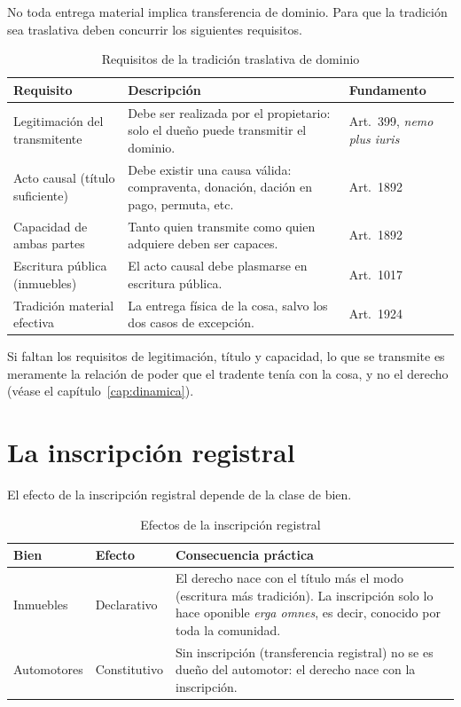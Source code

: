 \documentclass[12pt,oneside]{book}
\begin{document}
No toda entrega material implica transferencia de dominio. Para que la tradición sea traslativa deben concurrir los siguientes requisitos.

\begin{table}[H]
\centering
\small
\begin{tabularx}{\textwidth}{>{\raggedright\arraybackslash}p{}>{\raggedright\arraybackslash}X>{\raggedright\arraybackslash}p{}}
\toprule
\textbf{Requisito} & \textbf{Descripción} & \textbf{Fundamento} \\
\midrule
Legitimación del transmitente & Debe ser realizada por el propietario: solo el dueño puede transmitir el dominio. & Art.~399, \textit{nemo plus iuris} \\
Acto causal (título suficiente) & Debe existir una causa válida: compraventa, donación, dación en pago, permuta, etc. & Art.~1892 \\
Capacidad de ambas partes & Tanto quien transmite como quien adquiere deben ser capaces. & Art.~1892 \\
Escritura pública (inmuebles) & El acto causal debe plasmarse en escritura pública. & Art.~1017 \\
Tradición material efectiva & La entrega física de la cosa, salvo los dos casos de excepción. & Art.~1924 \\
\bottomrule
\end{tabularx}
\caption{Requisitos de la tradición traslativa de dominio}
\end{table}

Si faltan los requisitos de legitimación, título y capacidad, lo que se transmite es meramente la relación de poder que el tradente tenía con la cosa, y no el derecho (véase el capítulo~\ref{cap:dinamica}).

\section{La inscripción registral}

El efecto de la inscripción registral depende de la clase de bien.

\begin{table}[H]
\centering
\small
\begin{tabularx}{\textwidth}{>{\raggedright\arraybackslash}p{}>{\raggedright\arraybackslash}p{}>{\raggedright\arraybackslash}X}
\toprule
\textbf{Bien} & \textbf{Efecto} & \textbf{Consecuencia práctica} \\
\midrule
Inmuebles & Declarativo & El derecho nace con el título más el modo (escritura más tradición). La inscripción solo lo hace oponible \textit{erga omnes}, es decir, conocido por toda la comunidad. \\
Automotores & Constitutivo & Sin inscripción (transferencia registral) no se es dueño del automotor: el derecho nace con la inscripción. \\
\bottomrule
\end{tabularx}
\caption{Efectos de la inscripción registral}
\end{table}
\end{document}
